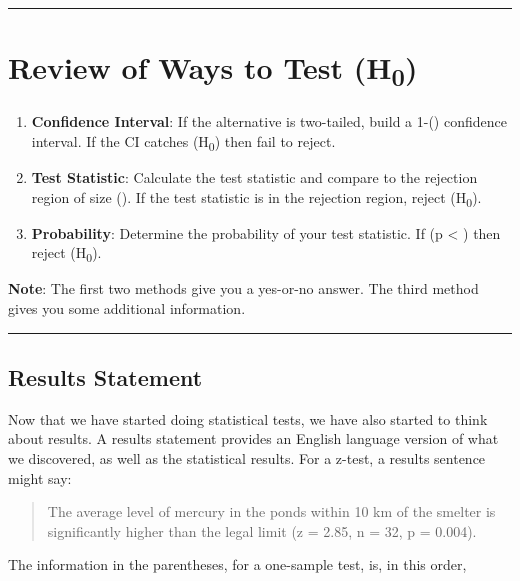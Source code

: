 \documentclass[
  letterpaper,
  DIV=11,
  numbers=noendperiod]{scrreprt}
\begin{document}
\begin{center}\rule{0.5\linewidth}{0.5pt}\end{center}

\section{\texorpdfstring{Review of Ways to Test
(H\textsubscript{0})}{Review of Ways to Test (H0)}}\label{review-of-ways-to-test-h0}

\begin{enumerate}
\def\labelenumi{\arabic{enumi}.}
\item
  \textbf{Confidence Interval}: If the alternative is two-tailed, build
  a 1-(\alpha) confidence interval. If the CI catches
  (H\textsubscript{0}) then fail to reject.
\item
  \textbf{Test Statistic}: Calculate the test statistic and compare to
  the rejection region of size (\alpha). If the test statistic is in the
  rejection region, reject (H\textsubscript{0}).
\item
  \textbf{Probability}: Determine the probability of your test
  statistic. If (p \textless{} \alpha) then reject (H\textsubscript{0}).
\end{enumerate}

\textbf{Note}: The first two methods give you a yes-or-no answer. The
third method gives you some additional information.

\begin{center}\rule{0.5\linewidth}{0.5pt}\end{center}

\subsection{Results Statement}\label{results-statement}

Now that we have started doing statistical tests, we have also started
to think about results. A results statement provides an English language
version of what we discovered, as well as the statistical results. For a
z-test, a results sentence might say:

\begin{quote}
The average level of mercury in the ponds within 10 km of the smelter is
significantly higher than the legal limit (z = 2.85, n = 32, p = 0.004).
\end{quote}

The information in the parentheses, for a one-sample test, is, in this
order,
\end{document}
